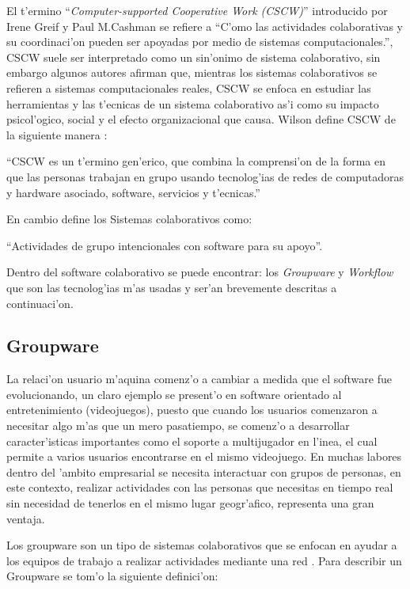 El t'ermino ``\textit{Computer-supported Cooperative Work (CSCW)}'' introducido por Irene Greif y Paul M.Cashman
\cite{brown1985interfaces} se refiere a ``C'omo las actividades colaborativas y su coordinaci'on pueden ser apoyadas por medio de sistemas computacionales.'', CSCW suele ser interpretado como un sin'onimo de sistema colaborativo, sin embargo algunos autores afirman que, mientras los sistemas colaborativos se refieren a sistemas computacionales reales, CSCW se enfoca en estudiar las herramientas y las t'ecnicas de un sistema colaborativo as'i como su impacto psicol'ogico, social y el efecto organizacional que causa. Wilson define CSCW de la siguiente manera \cite{wilson1991computer}:

\medskip
``CSCW es un t'ermino gen'erico, que combina la comprensi'on de la forma en que las personas trabajan en grupo usando tecnolog'ias de redes de computadoras y hardware asociado, software, servicios y t'ecnicas.''

\medskip
En cambio define los Sistemas colaborativos  como:

\medskip	
	``Actividades de grupo intencionales con software para su apoyo''.
	
\medskip
Dentro del software colaborativo se puede encontrar: los \textit{Groupware} y \textit{Workflow} que son las tecnolog'ias m'as usadas y ser'an brevemente descritas a continuaci'on.

\subsection{Groupware}
La relaci'on usuario m'aquina comenz'o a cambiar a medida que el software fue evolucionando, un claro ejemplo se present'o en software orientado al entretenimiento (videojuegos), puesto que cuando los usuarios comenzaron a necesitar algo m'as que un mero pasatiempo, se comenz'o a desarrollar caracter'isticas importantes como el soporte a multijugador en l'inea, el cual permite a varios usuarios encontrarse en el mismo videojuego. En muchas labores dentro del 'ambito empresarial se necesita interactuar con grupos de personas, en este contexto, realizar actividades con las personas que necesitas en tiempo real sin necesidad de tenerlos en el mismo lugar geogr'afico, representa una gran ventaja.
 
 \medskip
Los groupware son un tipo de sistemas colaborativos que se enfocan en ayudar a los equipos de trabajo a realizar actividades mediante una red \cite{ellis1991groupware}. Para describir un Groupware se tom'o la siguiente definici'on:

